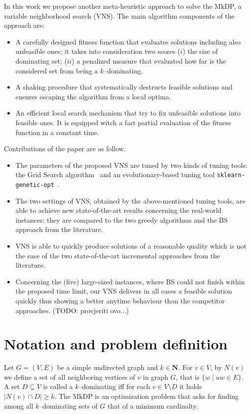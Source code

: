 \documentclass[sigconf]{acmart}
\begin{document}
In this work we propose another meta-heuristic approach to solve the MkDP, a variable neighborhood search (VNS). The main algorithm components of the approach are:
\begin{itemize}
	\item A carefully designed fitness function that evaluates solutions  including also unfeasible ones; it takes into consideration two scores ($i$) the size of dominating set; ($ii$) a penalized measure that evaluated how far is the considered set from being a $k$--dominating. 
	\item A shaking procedure that systematically destructs feasible solutions and ensures escaping the algorithm from a local optima.
	\item An efficient local search mechanism that try to fix unfeasible solutions into feasible ones. It is equipped witch a fast partial evaluation of the fitness function in a constant time.
 
\end{itemize}
Contributions of the paper are as follow.
\begin{itemize}
	\item The parameters of the proposed VNS are tuned by two kinds of tuning tools: the Grid Search algorithm~\cite{ranjan2019k} and an evolutionary-based tuning tool \texttt{sklearn-genetic-opt}~\cite{Arenas_Gomez2022}.  
	\item The two settings of VNS, obtained by the above-mentioned tuning tools, are able to achieve new state-of-the-art results concerning the real-world instances; they are compared to the two greedy algorithms and the BS approach from the literature. 
	\item VNS is able to quickly produce solutions of a reasonable quality which is not the case of the two state-of-the-art incremental approaches from the literature.
	\item Concerning the (five) large-sized instances, where BS could not finish within the proposed time limit, our VNS delivers in all cases a feasible solution quickly thus showing a better anytime behaviour than the competitor approaches. (TODO: provjeriti ovo...)
\end{itemize}

\section{Notation and problem definition }
    

    Let $G=(V,E)$ be a simple undirected graph and $k \in \mathbf{N}$. For $v\in V$, by $N(v)$ we define a set of all neighboring vertices of $v$ in graph  $G$, that is $\{w \mid uw \in E\}$. A set $D \subseteq V$ is called a $k$--dominating iff for each $v\in V \setminus D$ it holds $|N(v) \cap D| \geq k$.  The MkDP is an optimization problem that asks for finding among all $k$--dominating sets of $G$ that of a minimum cardinalty. 
    
\end{document}
